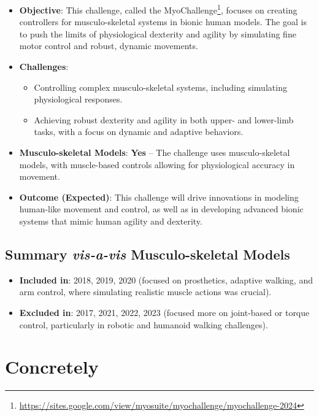 \documentclass[12pt,a4paper]{article}
\begin{document}
\begin{itemize}
    \item \textbf{Objective}: This challenge, called the MyoChallenge\footnote{%
        \url{https://sites.google.com/view/myosuite/myochallenge/myochallenge-2024}},
        focuses on creating controllers for musculo-skeletal systems in bionic human models.
        The goal is to push the limits of physiological dexterity and agility by simulating fine
        motor control and robust, dynamic movements.
    \item \textbf{Challenges}: 
    \begin{itemize}
        \item Controlling complex musculo-skeletal systems, including simulating physiological
            responses.
        \item Achieving robust dexterity and agility in both upper- and lower-limb tasks, with a
            focus on dynamic and adaptive behaviors.
    \end{itemize}
    \item \textbf{Musculo-skeletal Models}: \textbf{Yes} – The challenge uses musculo-skeletal
        models, with muscle-based controls allowing for physiological accuracy in movement.
    \item \textbf{Outcome (Expected)}: This challenge will drive innovations in modeling
        human-like movement and control, as well as in developing advanced bionic systems that
        mimic human agility and dexterity.
\end{itemize}

\subsection{Summary \textit{vis-a-vis} Musculo-skeletal Models}
\begin{itemize}
    \item \textbf{Included in}: 2018, 2019, 2020 (focused on prosthetics, adaptive walking, and
        arm control, where simulating realistic muscle actions was crucial).
    \item \textbf{Excluded in}: 2017, 2021, 2022, 2023 (focused more on joint-based or
        torque control, particularly in robotic and humanoid walking challenges).
\end{itemize}

\section{Concretely}
\end{document}
